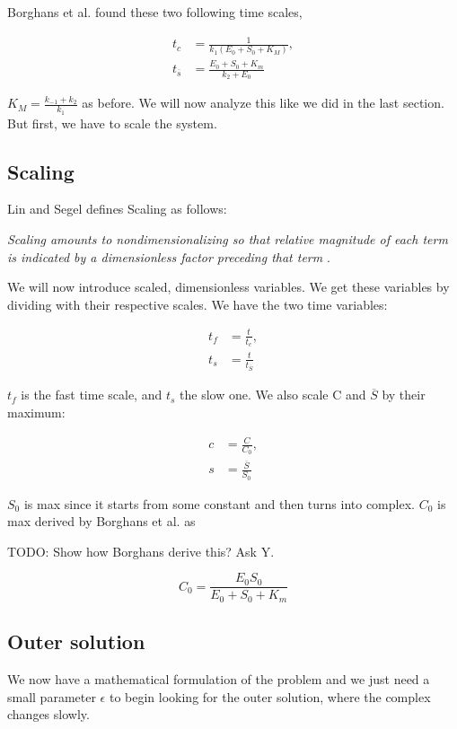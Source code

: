 \documentclass[12pt]{article}
\begin{document}
Borghans et al. found these two following time scales,

\begin{align}
t_c &= \frac{1}{k_1(E_0+S_0+K_M)}, \\
t_{\overline{s}} &= \frac{E_0+S_0+K_m}{k_2+E_0}
\end{align}

$K_M = \frac{k_{-1}+k_2}{k_1}$ as before. We will now analyze this like we did
in the last section. But first, we have to scale the system.

\subsection{Scaling}

Lin and Segel defines Scaling as follows:

\textit{Scaling amounts to nondimensionalizing so that relative magnitude of
each term is indicated by a dimensionless factor preceding that term}
\cite{lin1974mathematics}.

We will now introduce scaled, dimensionless variables. We get these variables by
dividing with their respective scales. We have the two time variables:

\begin{align}
t_f &= \frac{t}{t_c}, \\
t_s &= \frac{t}{t_{\overline{S}}}
\end{align}

$t_f$ is the fast time scale, and $t_s$ the slow one. We also scale C and
$\overline{S}$ by their maximum:

\begin{align}
c &= \frac{C}{C_0}, \\
s &= \frac{\overline{S}}{S_0}
\end{align}

$S_0$ is max since it starts from some constant and then turns into complex. $C_0$
is max derived by Borghans et al. \cite{borghans1996extending} as

TODO: Show how Borghans derive this? Ask Y.

\begin{equation}
C_0 = \frac{E_0 S_0}{E_0 + S_0 + K_m}
\end{equation}

\subsection{Outer solution}

We now have a mathematical formulation of the problem and we just need a small
parameter $\epsilon$ to begin looking for the outer solution, where the complex
changes slowly.
\end{document}
